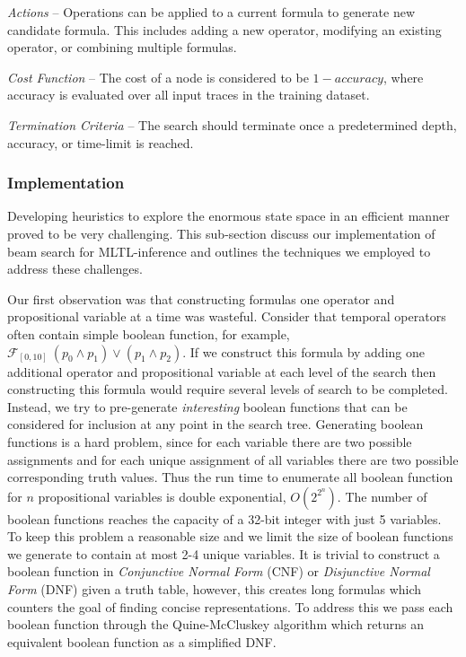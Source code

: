 \documentclass[12pt]{article}
\newcommand{\Finally}{\mathcal{F}}           %
\begin{document}
\textit{Actions} -- Operations can be applied to a current formula to generate new candidate formula. This includes adding a new operator, modifying an existing operator, or combining multiple formulas.

\textit{Cost Function} -- The cost of a node is considered to be $1-accuracy$, where accuracy is evaluated over all input traces in the training dataset.

\textit{Termination Criteria} -- The search should terminate once a predetermined depth, accuracy, or time-limit is reached.

\subsubsection{Implementation}

Developing heuristics to explore the enormous state space in an efficient manner proved to be very challenging. This sub-section discuss our implementation of beam search for MLTL-inference and outlines the techniques we employed to address these challenges.

Our first observation was that constructing formulas one operator and propositional variable at a time was wasteful. Consider that temporal operators often contain simple boolean function, for example, $\Finally_{[0,10]}\ (p_0 \land p_1 ) \lor (p_1 \land p_2 )$. If we construct this formula by adding one additional operator and propositional variable at each level of the search then constructing this formula would require several levels of search to be completed. Instead, we try to pre-generate \textit{interesting} boolean functions that can be considered for inclusion at any point in the search tree. Generating boolean functions is a hard problem, since for each variable there are two possible assignments and for each unique assignment of all variables there are two possible corresponding truth values. Thus the run time to enumerate all boolean function for $n$ propositional variables is double exponential, $O(2^{2^n})$. The number of boolean functions reaches the capacity of a 32-bit integer with just 5 variables. To keep this problem a reasonable size and we limit the size of boolean functions we generate to contain at most 2-4 unique variables. It is trivial to construct a boolean function in \textit{Conjunctive Normal Form} (CNF) or \textit{Disjunctive Normal Form} (DNF) given a truth table, however, this creates long formulas which counters the goal of finding concise representations. To address this we pass each boolean function through the Quine-McCluskey algorithm\cite{quine1952,quine1955,mccluskey1956} which returns an equivalent boolean function as a simplified DNF.
\end{document}
